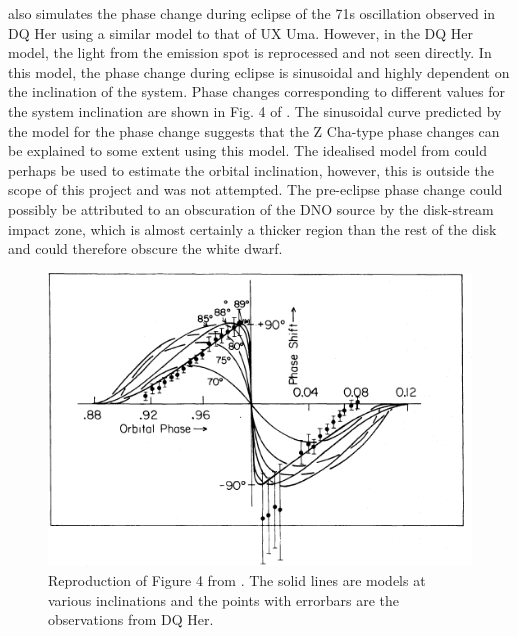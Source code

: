 \cite{1980ApJ...241..247P} also simulates the phase change during eclipse of the 71s oscillation observed in DQ Her \citep{dqher} using a similar model to that of UX Uma. However, in the DQ Her model, the light from the emission spot is reprocessed and not seen directly. In this model, the phase change during eclipse is sinusoidal and highly dependent on the inclination of the system. Phase changes corresponding to different values for the system inclination are shown in Fig. 4 of \cite{1980ApJ...241..247P}. The sinusoidal curve predicted by the model for the phase change suggests that the Z Cha-type phase changes can be explained to some extent using this model. The idealised model from \cite{1980ApJ...241..247P} could perhaps be used to estimate the orbital inclination, however, this is outside the scope of this project and was not attempted.  The pre-eclipse phase change could possibly be attributed to an obscuration of the DNO source by the disk-stream impact zone, which is almost certainly a thicker region than the rest of the disk and could therefore obscure the white dwarf.

\begin{figure}
 \centering
 \includegraphics[width=0.75\columnwidth,bb=0 0 517 358]{images/Petterson_Fig4_2.png}
 \caption[Fig. 4 from \cite{1980ApJ...241..247P}]{Reproduction of Figure 4 from \cite{1980ApJ...241..247P}. The solid lines are models at various inclinations and the points with errorbars are the observations from DQ Her.}
\end{figure}



